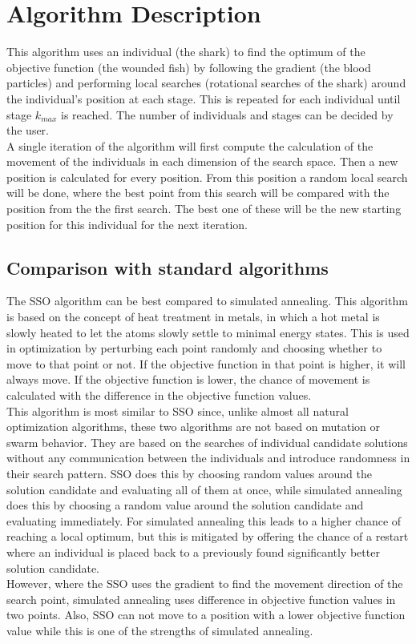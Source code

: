 \documentclass[runningheads]{llncs}
\begin{document}
\section{Algorithm Description} \label{sec:description}
This algorithm uses an individual (the shark) to find the optimum of the objective function (the wounded fish) by following the gradient (the blood particles) and performing local searches (rotational searches of the shark) around the individual's position at each stage. This is repeated for each individual until stage $k_{max}$ is reached. The number of individuals and stages can be decided by the user. \\
A single iteration of the algorithm will first compute the calculation of the movement of the individuals in each dimension of the search space. Then a new position is calculated for every position. From this position a random local search will be done, where the best point from this search will be compared with the position from the the first search. The best one of these will be the new starting position for this individual for the next iteration.


\subsection{Comparison with standard algorithms}
The SSO algorithm can be best compared to simulated annealing. This algorithm is based on the concept of heat treatment in metals, in which a hot metal is slowly heated to let the atoms slowly settle to minimal energy states. This is used in optimization by perturbing each point randomly and choosing whether to move to that point or not. If the objective function in that point is higher, it will always move. If the objective function is lower, the chance of movement is calculated with the difference in the objective function values.\\
This algorithm is most similar to SSO since, unlike almost all natural optimization algorithms, these two algorithms are not based on mutation or swarm behavior. They are based on the searches of individual candidate solutions without any communication between the individuals and introduce randomness in their search pattern. SSO does this by choosing random values around the solution candidate and evaluating all of them at once, while simulated annealing does this by choosing a random value around the solution candidate and evaluating immediately. For simulated annealing this leads to a higher chance of reaching a local optimum, but this is mitigated by offering the chance of a restart where an individual is placed back to a previously found significantly better solution candidate.\\
However, where the SSO uses the gradient to find the movement direction of the search point, simulated annealing uses difference in objective function values in two points. Also, SSO can not move to a position with a lower objective function value while this is one of the strengths of simulated annealing.\\
\end{document}
